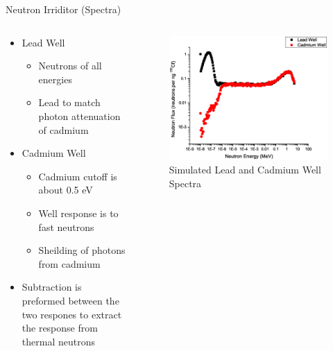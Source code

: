 \begin{frame}{Neutron Irriditor (Spectra)}
\begin{columns}[onlytextwidth]
\begin{column}{0.45\textwidth}
	\begin{itemize}
		\small
		\item Lead Well
		\begin{itemize}
			\tiny
			\item Neutrons of all energies
			\item Lead to match photon attenuation of cadmium
		\end{itemize}
		\small
		\item Cadmium Well
		\begin{itemize}
			\tiny
			\item Cadmium cutoff is about 0.5 eV
			\item Well response is to fast neutrons
			\item Sheilding of photons from cadmium
		\end{itemize}
		\small 
		\item Subtraction is preformed between the two respones to extract the response from thermal neutrons
	\end{itemize}
\end{column}
\begin{column}{0.45\textwidth}
	\begin{figure}
		\centering
		\includegraphics[height=\textwidth]{images/Graph19N.eps}
		\caption{Simulated Lead and Cadmium Well Spectra}
		\label{fig:SimPbCdSpectra}
	\end{figure}
\end{column}
\end{columns}
\end{frame}
